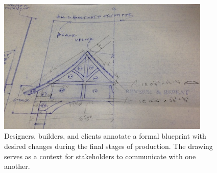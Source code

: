 \begin{figure}[t]
  \centering
  \includegraphics[width=4in]{img/late-phase-hand-annotation.jpg}
  \caption[Annotating a Blueprint]{Designers, builders, and clients
    annotate a formal blueprint with desired changes during the final
    stages of production. The drawing serves as a context for
    stakeholders to communicate with one another.}
  \label{fig:late-phase-annotate}
\end{figure}
